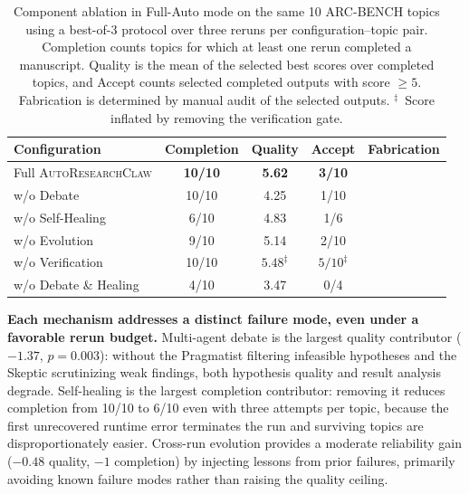 \documentclass{llmxive}
\providecommand{\system}{\textsc{AutoResearchClaw}}
\providecommand{\cmark}{\ding{51}}
\providecommand{\xmark}{\ding{55}}
\begin{document}
\begin{table}[t]
\centering
\small
\begin{tabularx}{\textwidth}{@{}lCCCC@{}}
\toprule
\textbf{Configuration} & \textbf{Completion} & \textbf{Quality} & \textbf{Accept} & \textbf{Fabrication} \\
\midrule
Full \system{}              & \textbf{10/10} & \textbf{5.62} & \textbf{3/10}             & \xmark \\
\quad w/o Debate            & 10/10          & 4.25          & 1/10                      & \xmark \\
\quad w/o Self-Healing      & 6/10           & 4.83          & 1/6                       & \xmark \\
\quad w/o Evolution         & 9/10           & 5.14          & 2/10                      & \xmark \\
\quad w/o Verification      & 10/10          & $5.48^{\ddagger}$ & $5/10^{\ddagger}$     & \cmark \\
\quad w/o Debate \& Healing & 4/10           & 3.47          & 0/4                       & \xmark \\
\bottomrule
\end{tabularx}
\caption{Component ablation in Full-Auto mode on the same 10 ARC-BENCH topics using a best-of-3 protocol over three reruns per configuration--topic pair. Completion counts topics for which at least one rerun completed a manuscript. Quality is the mean of the selected best scores over completed topics, and Accept counts selected completed outputs with score $\ge 5$. Fabrication is determined by manual audit of the selected outputs. $^{\ddagger}$~Score inflated by removing the verification gate.}
\label{tab:component-abl}
\end{table}

\noindent \textbf{Each mechanism addresses a distinct failure mode, even under a favorable rerun budget.}
Multi-agent debate is the largest quality contributor ($-1.37$, $p{=}0.003$): without the Pragmatist filtering infeasible hypotheses and the Skeptic scrutinizing weak findings, both hypothesis quality and result analysis degrade. Self-healing is the largest completion contributor: removing it reduces completion from 10/10 to 6/10 even with three attempts per topic, because the first unrecovered runtime error terminates the run and surviving topics are disproportionately easier. Cross-run evolution provides a moderate reliability gain ($-0.48$ quality, $-1$ completion) by injecting lessons from prior failures, primarily avoiding known failure modes rather than raising the quality ceiling.
\end{document}
